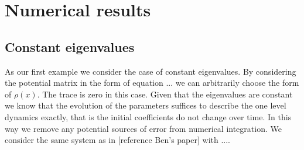 \documentclass[12pt]{article}
\numberwithin{equation}{section}
\begin{document}
  \section{Numerical results}
  \subsection{Constant eigenvalues}
  As our first example we consider the case of constant eigenvalues. 
  By considering the potential matrix in the form of equation ... 
  we can arbitrarily choose the form of $\rho(x)$. The trace is zero in 
  this case. Given that the eigenvalues are constant we know that 
  the evolution of the parameters suffices to describe the one level 
  dynamics exactly, that is the initial coefficients do not change over 
  time. In this way we remove any potential sources of error from numerical 
  integration.
  We consider the same system as in [reference Ben's paper] with ....
\end{document}
